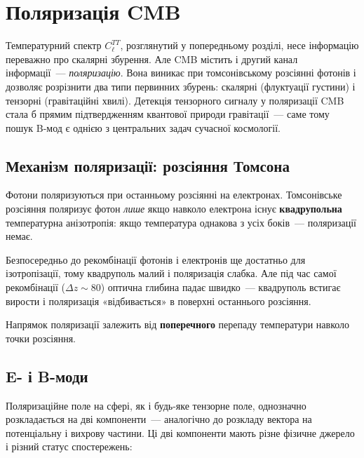 \documentclass[12pt, a4paper]{article}
\begin{document}
\section{Поляризація CMB}
\label{sec:pol}

Температурний спектр $C_\ell^{TT}$, розглянутий у попередньому
розділі, несе інформацію переважно про скалярні збурення.
Але CMB містить і другий канал інформації~--- \emph{поляризацію}.
Вона виникає при томсонівському розсіянні фотонів і дозволяє
розрізнити два типи первинних збурень: скалярні (флуктуації
густини) і тензорні (гравітаційні хвилі). Детекція тензорного
сигналу у поляризації CMB стала б прямим підтвердженням
квантової природи гравітації~--- саме тому пошук B-мод є
однією з центральних задач сучасної космології.

\subsection*{Механізм поляризації: розсіяння Томсона}

Фотони поляризуються при останньому розсіянні на електронах.
Томсонівське розсіяння поляризує фотон \emph{лише} якщо навколо електрона
існує \textbf{квадрупольна} температурна анізотропія: якщо температура
однакова з усіх боків~--- поляризації немає.

Безпосередньо до рекомбінації фотонів і електронів ще достатньо для
ізотропізації, тому квадруполь малий і поляризація слабка.
Але під час самої рекомбінації ($\Delta z \sim 80$) оптична глибина
падає швидко~--- квадруполь встигає вирости і поляризація «відбивається»
в поверхні останнього розсіяння.

Напрямок поляризації залежить від \textbf{поперечного} перепаду температури
навколо точки розсіяння.

\subsection*{E- і B-моди}

Поляризаційне поле на сфері, як і будь-яке тензорне поле,
однозначно розкладається на дві компоненти~--- аналогічно
до розкладу вектора на потенціальну і вихрову частини.
Ці дві компоненти мають різне фізичне джерело і різний
статус спостережень:
\end{document}
